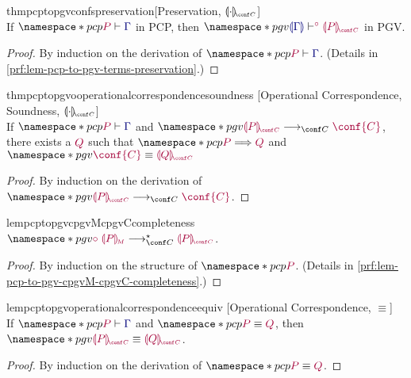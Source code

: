 \documentclass[main.tex]{subfiles}
\begin{document}
\begin{restatabletheorem}{thmpcptopgvconfspreservation}[Preservation, $\cpgvC{\cdot}$]
  \label{thm:pcp-to-pgv-confs-preservation}
  \hfill\\%
  If $\pcp{\seq{P}{\ty{\Gamma}}}$ in PCP,
  then $\pgv{\cseq[\child]{\ty{\cpgvT{\Gamma}}}{\cpgvC{P}}}$ in PGV.
\end{restatabletheorem}
\begin{proof}
  By induction on the derivation of $\pcp{\seq{P}{\ty{\Gamma}}}$.
  (Details in \cref{prf:lem-pcp-to-pgv-terms-preservation}.)
\end{proof}

\begin{restatabletheorem}{thmpcptopgvooperationalcorrespondencesoundness}%
  [Operational Correspondence, Soundness, $\cpgvC{\cdot}$]
  \label{thm:pcp-to-pgv-operational-correspondence-soundness}
  \hfill\\%
  If $\pcp{\seq{P}{\ty{\Gamma}}}$ and $\pgv{\tm{\cpgvC{P}}\cred\tm{\conf{C}}}$,
  there exists a $\tm{Q}$ such that $\pcp{\tm{P}\red\tm{Q}}$ and $\pgv{\tm{\conf{C}}\equiv\tm{\cpgvC{Q}}}$
\end{restatabletheorem}
\begin{proof}
  By induction on the derivation of $\pgv{\tm{\cpgvC{P}}\cred\tm{\conf{C}}}$.
  \admit
\end{proof}

\begin{restatablelemma}{lempcptopgvcpgvMcpgvCcompleteness}
  \label{lem:pcp-to-pgv-cpgvM-cpgvC-completeness}
  $\pgv{\tm{\child\;\cpgvM{P}}\cred^\star\tm{\cpgvC{P}}}$.
\end{restatablelemma}
\begin{proof}
  By induction on the structure of $\pcp{\tm{P}}$.
  (Details in \cref{prf:lem-pcp-to-pgv-cpgvM-cpgvC-completeness}.)
\end{proof}

\begin{restatablelemma}{lempcptopgvoperationalcorrespondenceequiv}%
  [Operational Correspondence, $\equiv$]
  \hfill\\%
  \label{lem:pcp-to-pgv-confs-operational-correspondence-equiv}
  If $\pcp{\seq{P}{\ty{\Gamma}}}$ and $\pcp{\tm{P}\equiv\tm{Q}}$,
  then $\pgv{\tm{\cpgvC{P}}\equiv\tm{\cpgvC{Q}}}$.
\end{restatablelemma}
\begin{proof}
  By induction on the derivation of $\pcp{\tm{P}\equiv\tm{Q}}$.
  \admit
\end{proof}
\end{document}
